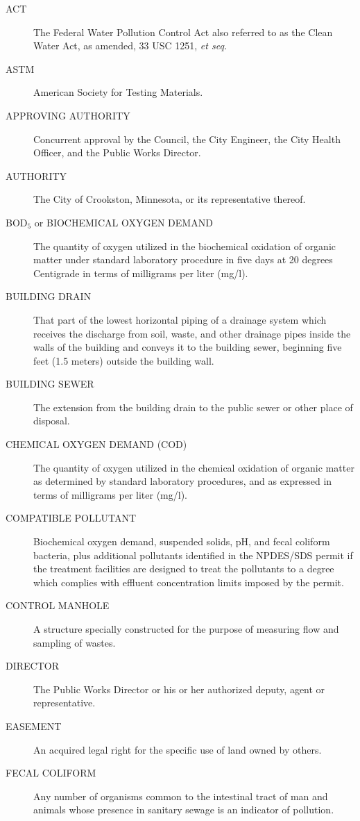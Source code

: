 \documentclass[code.tex]{subfiles}
\begin{document}
\begin{description}
\item[ACT] The Federal Water Pollution Control Act also referred to as the Clean Water Act, as amended, 33 USC 1251, \emph{et seq.}
\item[ASTM] American Society for Testing Materials.
\item[APPROVING AUTHORITY] Concurrent approval by the Council, the City Engineer, the City Health Officer, and the Public Works Director.
\item[AUTHORITY] The City of Crookston, Minnesota, or its representative thereof.
\item[BOD$_{5}$ or BIOCHEMICAL OXYGEN DEMAND] The quantity of oxygen utilized in the biochemical oxidation of organic matter under standard laboratory procedure in five days at 20 degrees Centigrade in terms of milligrams per liter (mg/l).
\item[BUILDING DRAIN] That part of the lowest horizontal piping of a drainage system which receives the discharge from soil, waste, and other drainage pipes inside the walls of the building and conveys it to the building sewer, beginning five feet (1.5 meters) outside the building wall.
\item[BUILDING SEWER] The extension from the building drain to the public sewer or other place of disposal.
\item[CHEMICAL OXYGEN DEMAND (COD)] The quantity of oxygen utilized in the chemical oxidation of organic matter as determined by standard laboratory procedures, and as expressed in terms of milligrams per liter (mg/l).
\item[COMPATIBLE POLLUTANT] Biochemical oxygen demand, suspended solids, pH, and fecal coliform bacteria, plus additional pollutants identified in the NPDES/SDS permit if the treatment facilities are designed to treat the pollutants to a degree which complies with effluent concentration limits imposed by the permit.
\item[CONTROL MANHOLE] A structure specially constructed for the purpose of measuring flow and sampling of wastes.
\item[DIRECTOR] The Public Works Director or his or her authorized deputy, agent or representative.
\item[EASEMENT] An acquired legal right for the specific use of land owned by others.
\item[FECAL COLIFORM] Any number of organisms common to the intestinal tract of man and animals whose presence in sanitary sewage is an indicator of pollution.

\end{description}
\end{document}
